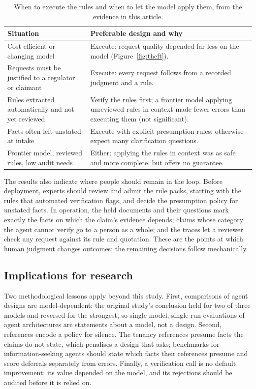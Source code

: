 \begin{table}[t]
\caption{When to execute the rules and when to let the model apply them, from the evidence in this article.}
\label{tab:guidance}
\small
\begin{tabularx}{\linewidth}{@{}XX@{}}
\toprule
Situation & Preferable design and why \\
\midrule
Cost-efficient or changing model & Execute: request quality depended far less on the model (Figure~\ref{fig:theft}). \\
Requests must be justified to a regulator or claimant & Execute: every request follows from a recorded judgment and a rule. \\
Rules extracted automatically and not yet reviewed & Verify the rules first; a frontier model applying unreviewed rules in context made fewer errors than executing them (not significant). \\
Facts often left unstated at intake & Execute with explicit presumption rules; otherwise expect many clarification questions. \\
Frontier model, reviewed rules, low audit needs & Either; applying the rules in context was as safe and more complete, but offers no guarantee. \\
\bottomrule
\end{tabularx}
\end{table}

The results also indicate where people should remain in the loop. Before deployment, experts should review and admit the rule packs, starting with the rules that automated verification flags, and decide the presumption policy for unstated facts. In operation, the held documents and their questions mark exactly the facts on which the claim's evidence depends; claims whose category the agent cannot verify go to a person as a whole; and the traces let a reviewer check any request against its rule and quotation. These are the points at which human judgment changes outcomes; the remaining decisions follow mechanically.

\subsection{Implications for research}
\label{sec:research}

Two methodological lessons apply beyond this study. First, comparisons of agent designs are model-dependent: the original study's conclusion held for two of three models and reversed for the strongest, so single-model, single-run evaluations of agent architectures are statements about a model, not a design. Second, references encode a policy for silence. The tenancy references presume facts the claims do not state, which penalises a design that asks; benchmarks for information-seeking agents should state which facts their references presume and score deferrals separately from errors. Finally, a verification call is no default improvement: its value depended on the model, and its rejections should be audited before it is relied on.

